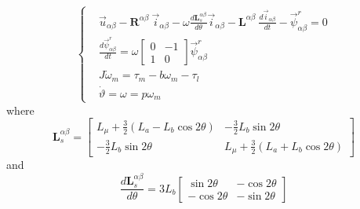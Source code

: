 \documentclass[12pt,a4paper]{scrartcl}
\begin{document}
\begin{onehalfspace}
\begin{equation}\label{twophase_eq1}
	\left\lbrace \begin{aligned}
		& \vec{u}_{\alpha\beta}-\mathbf{R}^{\alpha\beta}\ \vec{i}_{\alpha\beta}-\omega\frac{d\mathbf{L}_s^{\alpha\beta}}{d\theta}\vec{i}_{\alpha\beta}-\mathbf{L}^{\alpha\beta}\ \frac{d\vec{i}_{\alpha\beta}}{dt}-\vec{\psi}^r_{\alpha\beta} = 0 \\[6pt]
		& \frac{d\vec{\psi}^r_{\alpha\beta}}{dt} = \omega \begin{bmatrix} 0 & -1 \\ 1 & 0\end{bmatrix} \vec{\psi}^r_{\alpha\beta} \\[6pt]
		& J\dot{\omega}_m = \tau_m-b{\omega}_m-\tau_l \\[6pt]
		& \dot{\vartheta} = \omega =p\omega_m
	\end{aligned} \right. 
\end{equation}
where
\begin{equation}\label{Lab}
	\mathbf{L}_s^{\alpha\beta} = 
	\begin{bmatrix} 
		L_{\mu}+\frac{3}{2}(L_a-L_b\cos2\theta) & -\frac{3}{2}L_b\sin2\theta \\[6pt]
		-\frac{3}{2}L_b\sin2\theta & L_{\mu}+\frac{3}{2}(L_a+L_b\cos2\theta)
	\end{bmatrix}
\end{equation}
and
\begin{equation}
	\frac{d\mathbf{L}_s^{\alpha\beta}}{d\theta} = 3L_b
	\begin{bmatrix} 
		\sin 2\theta & -\cos 2\theta \\[6pt]
		-\cos 2\theta & -\sin 2\theta
	\end{bmatrix}
\end{equation}


\end{onehalfspace}
\end{document}
